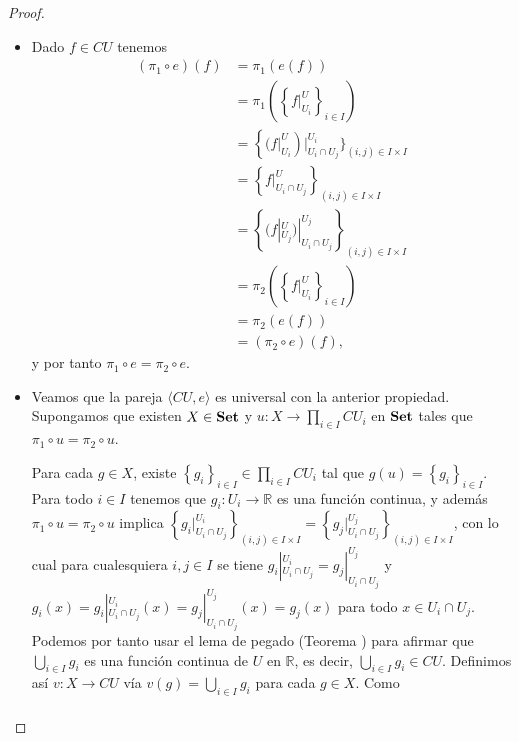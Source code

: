 \begin{proof}
   \begin{itemize}
      \item Dado $f\in CU$ tenemos
         $$
         \begin{aligned}
            (\pi_1\circ e)(f)&=\pi_1(e(f))\\
                             &=\pi_1\left(\left\lbrace f|^U_{U_i}\right\rbrace_{i\in I}\right)\\
                             &=\left\lbrace (f|^U_{U_i}\right)|^{U_i}_{U_i\cap U_j}\rbrace_{(i,j)\in I\times I}\\
                             &=\left\lbrace f|^U_{U_i\cap U_j}\right\rbrace_{(i,j)\in I\times I}\\
                             &=\left\lbrace (f|^U_{U_j})|^{U_j}_{U_i\cap U_j}\right\rbrace_{(i,j)\in I\times I}\\
                             &=\pi_2\left(\left\lbrace f|^U_{U_i}\right\rbrace_{i\in I}\right)\\
                             &=\pi_2(e(f))\\
                             &=(\pi_2\circ e)(f),
         \end{aligned}
         $$
         y por tanto $\pi_1\circ e=\pi_2\circ e$.
      \item Veamos que la pareja $\langle CU,e\rangle$ es universal con la anterior propiedad. Supongamos que existen $X\in\normalfont{\textbf{Set}}$ y $u:X\to\prod_{i\in I}CU_i$ en $\normalfont{\textbf{Set}}$ tales que $\pi_1\circ u=\pi_2\circ u$.
         
         Para cada $g\in X$, existe $\left\lbrace g_i\right\rbrace_{i\in I}\in\prod_{i\in I}CU_i$ tal que $g(u)=\left\lbrace g_i\right\rbrace_{i\in I}$. Para todo $i\in I$ tenemos que $g_i:U_i\to \mathbb{R}$ es una función continua, y además $\pi_1\circ u=\pi_2\circ u$ implica $\left\lbrace {g_i}|^{U_i}_{U_i\cap U_j}\right\rbrace_{(i,j)\in I\times I}=\left\lbrace {g_j}|^{U_j}_{U_i\cap U_j}\right\rbrace_{(i,j)\in I\times I}$, con lo cual para cualesquiera $i,j\in I$ se tiene $g_i|^{U_i}_{U_i\cap U_j}=g_j|^{U_j}_{U_i\cap U_j}$ y $g_i(x)=g_i|^{U_i}_{U_i\cap U_j}(x)=g_j|^{U_j}_{U_i\cap U_j}(x)=g_j(x)$ para todo $x\in U_i\cap U_j$. Podemos por tanto usar el lema de pegado (Teorema ) para afirmar que $\bigcup_{i\in I}g_i$ es una función continua de $U$ en $\mathbb{R}$, es decir, $\bigcup_{i\in I}g_i\in CU$. Definimos así $v:X\to CU$ vía $v(g)=\bigcup_{i\in I}g_i$ para cada $g\in X$. Como 
         $$
         \begin{aligned}

\end{aligned}$$
\end{itemize}
\end{proof}
